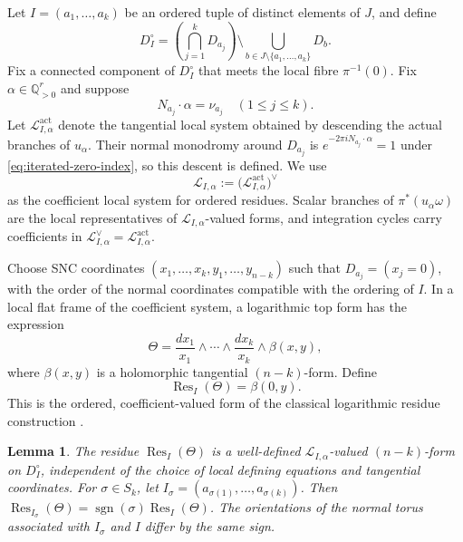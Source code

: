 \documentclass[12pt]{amsart}
\numberwithin{equation}{section}
\theoremstyle{plain}
\newtheorem{lemma}[theorem]{Lemma}
\theoremstyle{definition}
\theoremstyle{remark}
\theoremstyle{definition}
\DeclareMathOperator{\Res}{Res}
\DeclareMathOperator{\sgn}{sgn}
\newcommand{\Q}{\mathbb Q}
\newcommand{\Lcal}{\mathscr L}
\begin{document}
Let $I=(a_1,\ldots,a_k)$ be an ordered tuple of distinct elements of $J$, and define
\[
D_I^\circ=
\left(\bigcap_{j=1}^k D_{a_j}\right)
\setminus
\bigcup_{b\in J\setminus\{a_1,\ldots,a_k\}}D_b.
\]
Fix a connected component of $D_I^\circ$ that meets the local fibre $\pi^{-1}(0)$. Fix $\alpha\in\Q_{>0}^r$ and suppose 
\begin{equation}\label{eq:iterated-zero-index}
 N_{a_j}\cdot\alpha=\nu_{a_j}\quad(1\leq j\leq k).
\end{equation}
Let $\Lcal_{I,\alpha}^{\mathrm{act}}$ denote the tangential local system obtained by descending the actual branches of $u_\alpha$. Their normal monodromy around $D_{a_j}$ is $e^{-2\pi iN_{a_j}\cdot\alpha}=1$ under \eqref{eq:iterated-zero-index}, so this descent is defined. We use
\[
 \Lcal_{I,\alpha}:=\bigl(\Lcal_{I,\alpha}^{\mathrm{act}}\bigr)^\vee
\]
as the coefficient local system for ordered residues. Scalar branches of $\pi^*(u_\alpha\omega)$ are the local representatives of $\Lcal_{I,\alpha}$-valued forms, and integration cycles carry coefficients in $\Lcal_{I,\alpha}^\vee=\Lcal_{I,\alpha}^{\mathrm{act}}$.

Choose SNC coordinates $(x_1,\ldots,x_k,y_1,\ldots,y_{n-k})$ such that $D_{a_j}=(x_j=0)$, with the order of the normal coordinates compatible with the ordering of $I$. In a local flat frame of the coefficient system, a logarithmic top form has the expression
\begin{equation}\label{eq:ordered-log-expansion}
\Theta=
\frac{dx_1}{x_1}\wedge\cdots\wedge\frac{dx_k}{x_k}\wedge\beta(x,y),
\end{equation}
where $\beta(x,y)$ is a holomorphic tangential $(n-k)$-form. Define
\[
\Res_I(\Theta)=\beta(0,y).
\]
This is the ordered, coefficient-valued form of the classical logarithmic residue construction \cite{Deligne1970}.

\begin{lemma}\label{lem:ordered-residue-conventions}
The residue $\Res_I(\Theta)$ is a well-defined $\Lcal_{I,\alpha}$-valued $(n-k)$-form on $D_I^\circ$, independent of the choice of local defining equations and tangential coordinates. For $\sigma\in S_k$, let $I_\sigma=(a_{\sigma(1)},\ldots,a_{\sigma(k)})$. Then $\Res_{I_\sigma}(\Theta)=\sgn(\sigma)\Res_I(\Theta)$. The orientations of the normal torus associated with $I_\sigma$ and $I$ differ by the same sign.
\end{lemma}
\end{document}
